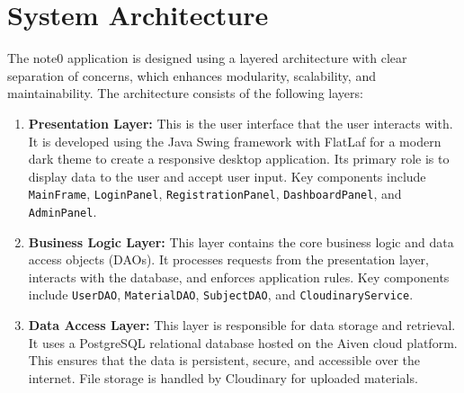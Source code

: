 \documentclass[12pt, a4paper]{report}
\begin{document}
\section{System Architecture}
The note0 application is designed using a layered architecture with clear separation of concerns, which enhances modularity, scalability, and maintainability. The architecture consists of the following layers:

\begin{enumerate}
    \item \textbf{Presentation Layer:} This is the user interface that the user interacts with. It is developed using the Java Swing framework with FlatLaf for a modern dark theme to create a responsive desktop application. Its primary role is to display data to the user and accept user input. Key components include \texttt{MainFrame}, \texttt{LoginPanel}, \texttt{RegistrationPanel}, \texttt{DashboardPanel}, and \texttt{AdminPanel}.
    \item \textbf{Business Logic Layer:} This layer contains the core business logic and data access objects (DAOs). It processes requests from the presentation layer, interacts with the database, and enforces application rules. Key components include \texttt{UserDAO}, \texttt{MaterialDAO}, \texttt{SubjectDAO}, and \texttt{CloudinaryService}.
    \item \textbf{Data Access Layer:} This layer is responsible for data storage and retrieval. It uses a PostgreSQL relational database hosted on the Aiven cloud platform. This ensures that the data is persistent, secure, and accessible over the internet. File storage is handled by Cloudinary for uploaded materials.
\end{enumerate}
\end{document}
